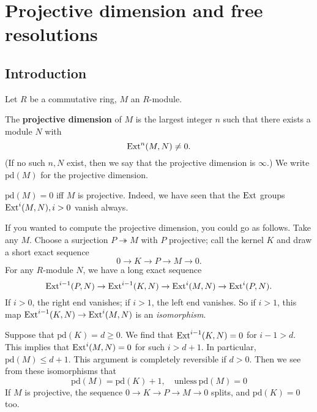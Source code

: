 \section{Projective dimension and free resolutions}

\subsection{Introduction}
\newcommand{\pr}{\mathrm{pd}}
Let $R$ be a commutative ring, $M$ an $R$-module.

\begin{definition}
The \textbf{projective dimension} of $M$ is the largest integer
$n$ such that
there exists  a module $N$ with
\[ \operatorname{Ext}^n(M,N) \neq 0.  \]
(If no such $n,N$ exist, then we say that the projective
dimension is $\infty$.)
We write $\pr(M)$ for the projective dimension.
\end{definition}

\begin{remark}
$\pr(M) = 0$ iff $M$ is projective. Indeed, we have seen that
the $\operatorname{Ext}$ groups
$\operatorname{Ext}^i(M,N), i >0$
vanish always.
\end{remark}

If you wanted to compute the projective dimension, you could go
as follows.
Take any $M$. Choose a surjection $P \twoheadrightarrow M$ with
$P$ projective;
call the kernel $K$ and draw a short exact sequence
\[ 0 \to K \to P \to M \to 0.  \]
For any $R$-module $N$, we have a long exact sequence
\[ \operatorname{Ext}^{i-1}(P,N) \to \operatorname{Ext}^{i-1}(K,N) \to \operatorname{Ext}^i(M,N) \to
\operatorname{Ext}^i(P, N). \]
If $i >0$, the right end vanishes; if $i >1$, the left end
vanishes. So if $i
>1$, this map $\operatorname{Ext}^{i-1}(K,N) \to \operatorname{Ext}^i(M,N)$ is an
\emph{isomorphism}.

Suppose that $\pr(K) = d \geq 0$. We find that
$\operatorname{Ext}^{i-1}(K,N)=0$ for $i-1
> d$.
This implies that $\operatorname{Ext}^i(M,N) = 0$ for such $i > d+1$. In
particular, $\pr(M)
\leq d+1$.
This argument is completely reversible if $d >0$.
Then we see from these isomorphisms that
\[ \boxed{\pr(M) = \pr(K)+1}, \quad \mathrm{unless} \ \pr(M)=0
\]
If $M$ is projective, the sequence $0 \to K \to P \to M \to 0$
splits, and
$\pr(K)=0$ too.

